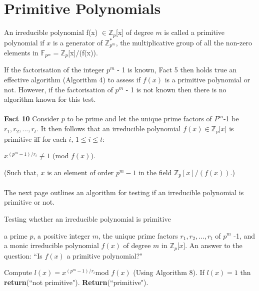 \documentclass[iwp,first]{luthesis}
\begin{document}
\section{Primitive Polynomials}

\begin{mydef}
An irreducible polynomial f(x) $\in \mathbb{Z}_{p}$[x] of degree $m$ is called a primitive polynomial if $x$ is a generator of $\mathbb{Z}_{p^m}^{*}$, the multiplicative group of all the non-zero elements in $\mathbb{F}_{p^m} = \mathbb{Z}_{p}$[x]/(f(x)).
\end{mydef}

If the factorisation of the integer $p^{m}$ - 1 is known, Fact 5 then holds true an effective algorithm (Algorithm 4) to assess if $f(x)$ is a primitive polynomial or not. However, if the factorisation of $p^m$ - 1 is not known then there is no algorithm known for this test.
\\
\\
\textbf{Fact 10} Consider $p$ to be prime and let the unique prime factors of $P^m$-1 be $r_1,r_2,...,r_t$. It then follows that an irreducible polynomial $f(x) \in \mathbb{Z}_p$[$x$] is primitive iff for each $i$, $1 \leq i \leq t$: 

\begin{center}
$x^{(p^{m} - 1)/{r_i}} \not\equiv 1$ (mod $f(x)$).
\end{center}

(Such that, $x$ is an element of order $p^{m}-1$ in the field $\mathbb{Z}_{p}[x]/(f(x))$.)
\\
\\
The next page outlines an algorithm for testing if an irreducible polynomial is primitive or not.

\begin{algorithm}
\caption{Testing whether an irreducible polynomial is primitive}
\begin{algorithmic}
\REQUIRE a prime $p$, a positive integer $m$, the unique prime factors $r_1, r_2,...,r_t$ of $p^m$ -1, and a monic irreducible polynomial $f(x)$ of degree $m$ in $\mathbb{Z}_{p}$[$x$].
\ENSURE An answer to the question: ``Is $f(x)$ a primitive polynomial?"
\begin{enumerate}
 Compute $l(x) = x^{(p^{m}-1)/{r_i}}$mod $f(x)$ (Using Algorithm 8).
 If $l(x) = 1$ thn \textbf{return}(``not primitive").
\ENDFOR
\STATE \textbf{Return}(``primitive").
\end{enumerate}
\end{algorithmic}
\end{algorithm}
\end{document}
